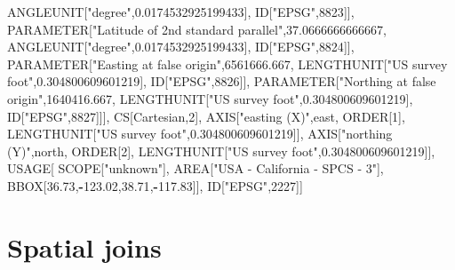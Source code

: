 \documentclass[
  12pt,
]{book}
\newenvironment{Shaded}{\begin{snugshade}}{\end{snugshade}}
\newcommand{\DecValTok}[1]{\textcolor[rgb]{0.06,0.06,0.06}{#1}}
\newcommand{\FloatTok}[1]{\textcolor[rgb]{0.06,0.06,0.06}{#1}}
\newcommand{\NormalTok}[1]{#1}
\newcommand{\OperatorTok}[1]{\textcolor[rgb]{0.43,0.43,0.43}{\textbf{#1}}}
\newcommand{\StringTok}[1]{\textcolor[rgb]{0.5,0.5,0.5}{#1}}
\begin{document}
\begin{Shaded}
\begin{Highlighting}[]
\NormalTok{            ANGLEUNIT[}\StringTok{"degree"}\NormalTok{,}\FloatTok{0.0174532925199433}\NormalTok{],}
\NormalTok{            ID[}\StringTok{"EPSG"}\NormalTok{,}\DecValTok{8823}\NormalTok{]],}
\NormalTok{        PARAMETER[}\StringTok{"Latitude of 2nd standard parallel"}\NormalTok{,}\FloatTok{37.0666666666667}\NormalTok{,}
\NormalTok{            ANGLEUNIT[}\StringTok{"degree"}\NormalTok{,}\FloatTok{0.0174532925199433}\NormalTok{],}
\NormalTok{            ID[}\StringTok{"EPSG"}\NormalTok{,}\DecValTok{8824}\NormalTok{]],}
\NormalTok{        PARAMETER[}\StringTok{"Easting at false origin"}\NormalTok{,}\FloatTok{6561666.667}\NormalTok{,}
\NormalTok{            LENGTHUNIT[}\StringTok{"US survey foot"}\NormalTok{,}\FloatTok{0.304800609601219}\NormalTok{],}
\NormalTok{            ID[}\StringTok{"EPSG"}\NormalTok{,}\DecValTok{8826}\NormalTok{]],}
\NormalTok{        PARAMETER[}\StringTok{"Northing at false origin"}\NormalTok{,}\FloatTok{1640416.667}\NormalTok{,}
\NormalTok{            LENGTHUNIT[}\StringTok{"US survey foot"}\NormalTok{,}\FloatTok{0.304800609601219}\NormalTok{],}
\NormalTok{            ID[}\StringTok{"EPSG"}\NormalTok{,}\DecValTok{8827}\NormalTok{]]],}
\NormalTok{    CS[Cartesian,}\DecValTok{2}\NormalTok{],}
\NormalTok{        AXIS[}\StringTok{"easting (X)"}\NormalTok{,east,}
\NormalTok{            ORDER[}\DecValTok{1}\NormalTok{],}
\NormalTok{            LENGTHUNIT[}\StringTok{"US survey foot"}\NormalTok{,}\FloatTok{0.304800609601219}\NormalTok{]],}
\NormalTok{        AXIS[}\StringTok{"northing (Y)"}\NormalTok{,north,}
\NormalTok{            ORDER[}\DecValTok{2}\NormalTok{],}
\NormalTok{            LENGTHUNIT[}\StringTok{"US survey foot"}\NormalTok{,}\FloatTok{0.304800609601219}\NormalTok{]],}
\NormalTok{    USAGE[}
\NormalTok{        SCOPE[}\StringTok{"unknown"}\NormalTok{],}
\NormalTok{        AREA[}\StringTok{"USA {-} California {-} SPCS {-} 3"}\NormalTok{],}
\NormalTok{        BBOX[}\FloatTok{36.73}\NormalTok{,}\OperatorTok{{-}}\FloatTok{123.02}\NormalTok{,}\FloatTok{38.71}\NormalTok{,}\OperatorTok{{-}}\FloatTok{117.83}\NormalTok{]],}
\NormalTok{    ID[}\StringTok{"EPSG"}\NormalTok{,}\DecValTok{2227}\NormalTok{]]}
\end{Highlighting}
\end{Shaded}

\hypertarget{spatial-joins}{%
\section{Spatial joins}\label{spatial-joins}}
\end{document}
